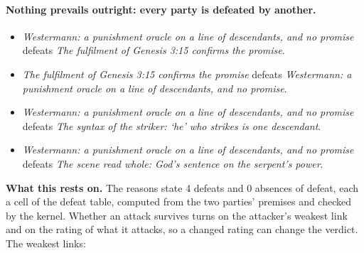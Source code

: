 \documentclass[11pt]{article}
\begin{document}
\paragraph{Nothing prevails outright: every party is defeated by another.}
\begin{itemize}
\item \emph{Westermann: a punishment oracle on a line of descendants, and no promise} defeats \emph{The fulfilment of Genesis 3:15 confirms the promise}.
\item \emph{The fulfilment of Genesis 3:15 confirms the promise} defeats \emph{Westermann: a punishment oracle on a line of descendants, and no promise}.
\item \emph{Westermann: a punishment oracle on a line of descendants, and no promise} defeats \emph{The syntax of the striker: ‘he’ who strikes is one descendant}.
\item \emph{Westermann: a punishment oracle on a line of descendants, and no promise} defeats \emph{The scene read whole: God’s sentence on the serpent’s power}.
\end{itemize}
\par\noindent\textbf{What this rests on.} The reasons state 4 defeats and 0 absences of defeat, each a cell of the defeat table, computed from the two parties' premises and checked by the kernel. Whether an attack survives turns on the attacker's weakest link and on the rating of what it attacks, so a changed rating can change the verdict. The weakest links:
\end{document}
